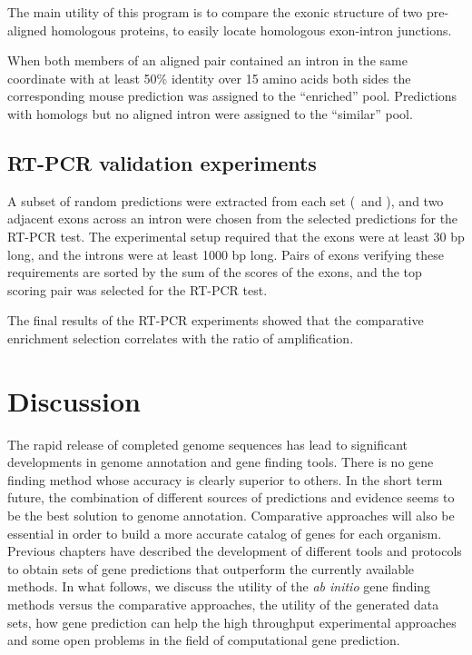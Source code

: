 The main utility of this program is to compare the exonic structure of
two pre-aligned homologous proteins, to easily locate homologous
exon-intron junctions. 

When both members of an aligned pair contained an intron in
the same coordinate with at least 50\% identity over 15 amino acids
both sides the corresponding mouse prediction was assigned to the
``enriched'' pool. Predictions with homologs but no aligned intron
were assigned to the ``similar'' pool.



\section{RT-PCR validation experiments}


A subset of random predictions were extracted from each set (\sgp\ and
\twinscan), and two adjacent exons across an intron were chosen from
the selected predictions for the RT-PCR test. The experimental setup
required that the exons were at least 30 bp long, and the introns were
at least 1000 bp long. Pairs of exons verifying these requirements are
sorted by the sum of the scores of the exons, and the top scoring pair
was selected for the RT-PCR test.

The final results of the RT-PCR experiments showed that the
comparative enrichment selection correlates with the ratio of
amplification.


\newpage






\chapter{Discussion}

The rapid release of completed genome sequences has lead to
significant developments in genome annotation and gene finding
tools. There is no gene finding method whose accuracy is clearly
superior to others. In the short term future, the combination of
different sources of predictions and evidence seems to be the best
solution to genome annotation. Comparative approaches will also be
essential in order to build a more accurate catalog of genes for each
organism. Previous chapters have described the development of
different tools and protocols to obtain sets of gene predictions that
outperform the currently available methods.  In what follows, we
discuss the utility of the \textit{ab initio} gene finding methods
versus the comparative approaches, the utility of the generated data
sets, how gene prediction can help the high throughput experimental
approaches and some open problems in the field of computational gene
prediction.

